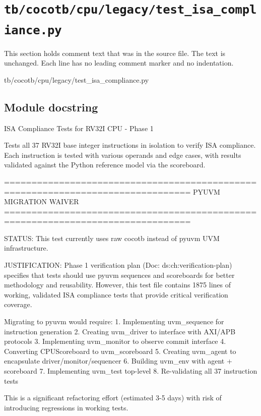\section{\texttt{tb/cocotb/cpu/legacy/test\_isa\_compliance.py}}\label{tm:suite:cpu-legacy-test-isa-compliance}

This section holds comment text that was in the source file. The text is unchanged. Each line has no leading comment marker and no indentation.

\begin{relocated}{tb/cocotb/cpu/legacy/test_isa_compliance.py}

\subsection*{Module docstring}

\begin{textblock}
ISA Compliance Tests for RV32I CPU - Phase 1

Tests all 37 RV32I base integer instructions in isolation to verify
ISA compliance. Each instruction is tested with various operands and
edge cases, with results validated against the Python reference model
via the scoreboard.

================================================================================
PYUVM MIGRATION WAIVER
================================================================================

STATUS: This test currently uses raw cocotb instead of pyuvm UVM infrastructure.

JUSTIFICATION:
Phase 1 verification plan (Doc: ds:ch:verification-plan) specifies
that tests should use pyuvm sequences and scoreboards for better methodology
and reusability. However, this test file contains 1875 lines of working,
validated ISA compliance tests that provide critical verification coverage.

Migrating to pyuvm would require:
1. Implementing uvm_sequence for instruction generation
2. Creating uvm_driver to interface with AXI/APB protocols
3. Implementing uvm_monitor to observe commit interface
4. Converting CPUScoreboard to uvm_scoreboard
5. Creating uvm_agent to encapsulate driver/monitor/sequencer
6. Building uvm_env with agent + scoreboard
7. Implementing uvm_test top-level
8. Re-validating all 37 instruction tests

This is a significant refactoring effort (estimated 3-5 days) with risk of
introducing regressions in working tests.


\end{textblock}
\end{relocated}
